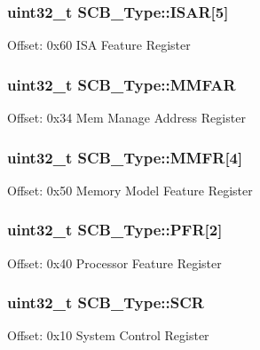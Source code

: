 \subsubsection[{\texorpdfstring{I\+S\+AR}{ISAR}}]{ uint32\+\_\+t S\+C\+B\+\_\+\+Type\+::\+I\+S\+AR\mbox{[}5\mbox{]}}\hypertarget{structSCB__Type_acee8e458f054aac964268f4fe647ea4f}{}\label{structSCB__Type_acee8e458f054aac964268f4fe647ea4f}
Offset\+: 0x60 I\+SA Feature Register 
\subsubsection[{\texorpdfstring{M\+M\+F\+AR}{MMFAR}}]{ uint32\+\_\+t S\+C\+B\+\_\+\+Type\+::\+M\+M\+F\+AR}\hypertarget{structSCB__Type_ac49b24b3f222508464f111772f2c44dd}{}\label{structSCB__Type_ac49b24b3f222508464f111772f2c44dd}
Offset\+: 0x34 Mem Manage Address Register 
\subsubsection[{\texorpdfstring{M\+M\+FR}{MMFR}}]{ uint32\+\_\+t S\+C\+B\+\_\+\+Type\+::\+M\+M\+FR\mbox{[}4\mbox{]}}\hypertarget{structSCB__Type_aec2f8283d2737c6897188568a4214976}{}\label{structSCB__Type_aec2f8283d2737c6897188568a4214976}
Offset\+: 0x50 Memory Model Feature Register 
\subsubsection[{\texorpdfstring{P\+FR}{PFR}}]{ uint32\+\_\+t S\+C\+B\+\_\+\+Type\+::\+P\+FR\mbox{[}2\mbox{]}}\hypertarget{structSCB__Type_a3f51c43f952f3799951d0c54e76b0cb7}{}\label{structSCB__Type_a3f51c43f952f3799951d0c54e76b0cb7}
Offset\+: 0x40 Processor Feature Register 
\subsubsection[{\texorpdfstring{S\+CR}{SCR}}]{ uint32\+\_\+t S\+C\+B\+\_\+\+Type\+::\+S\+CR}\hypertarget{structSCB__Type_abfad14e7b4534d73d329819625d77a16}{}\label{structSCB__Type_abfad14e7b4534d73d329819625d77a16}
Offset\+: 0x10 System Control Register 
